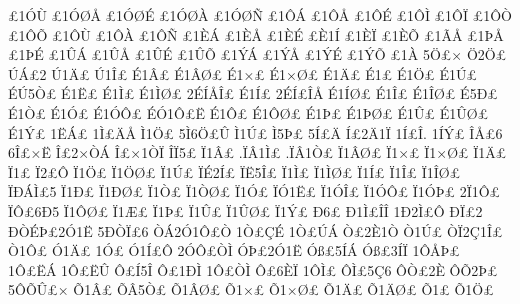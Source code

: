 {^^a31^^d3^^d9
^^a31^^d3^^d8^^c5
^^a31^^d3^^d8^^c9
^^a31^^d3^^d8^^c0
^^a31^^d3^^d8^^d1
^^a31^^d4^^c1
^^a31^^d4^^c5
^^a31^^d4^^c9
^^a31^^d4^^cc
^^a31^^d4^^cf
^^a31^^d4^^d2
^^a31^^d4^^d5
^^a31^^d4^^d9
^^a31^^d4^^c0
^^a31^^d4^^d1
^^a31^^c8^^c1
^^a31^^c8^^c5
^^a31^^c8^^c9
^^a3^^c81^^cd
^^a31^^c8^^cf
^^a31^^c8^^d5
^^a31^^c3^^c5
^^a31^^de^^c5
^^a31^^de^^c9
^^a31^^db^^c1
^^a31^^db^^c5
^^a31^^db^^c9
^^a31^^db^^d5
^^a31^^dd^^c1
^^a31^^dd^^c5
^^a31^^dd^^c9
^^a31^^dd^^d5
^^a31^^c0
5^^d6^^a3^^d7
^^d62^^d6^^a3
^^da^^c1^^a32
^^da1^^c4^^a3
^^da1^^ce^^a3
^^c91^^c2^^a3
^^c91^^c2^^d8^^a3
^^c91^^d7^^a3
^^c91^^d7^^d8^^a3
^^c91^^c4^^a3
^^c91^^a3
^^c91^^d6^^a3
^^c91^^da^^a3
^^c9^^da5^^d2^^a3
^^c91^^cb^^a3
^^c91^^cc^^a3
^^c91^^cc^^d8^^a3
2^^c9^^cd^^c5^^ce^^a3
^^c91^^cd^^a3
2^^c9^^cd^^a3^^ce^^c5
^^c91^^cd^^d8^^a3
^^c91^^ce^^a3
^^c91^^ce^^d8^^a3
^^c95^^d0^^a3
^^c91^^d2^^a3
^^c91^^d3^^a3
^^c91^^d3^^d4^^a3
^^c9^^d31^^d4^^a3^^cb
^^c91^^d4^^a3
^^c91^^d4^^d8^^a3
^^c91^^de^^a3
^^c91^^de^^d8^^a3
^^c91^^db^^a3
^^c91^^db^^d8^^a3
^^c91^^dd^^a3
1^^cb^^c1^^a3
1^^cc^^a3^^c4^^c5
^^cc1^^d6^^a3
5^^cc6^^d6^^a3^^db
^^cc1^^da^^a3
^^cc5^^de^^a3
5^^cd^^a3^^c4
^^cd^^a32^^c41^^cf
1^^cd^^a3^^ce.
1^^cd^^dd^^a3
^^ce^^c5^^a36
6^^ce^^a3^^d7^^cb
^^ce^^a32^^d7^^d2^^c1
^^ce^^a3^^d71^^d2^^cf
^^ce^^cf5^^a3
^^cf1^^c2^^a3
.^^cf^^c21^^cc^^a3
.^^cf^^c21^^d2^^a3
^^cf1^^c2^^d8^^a3
^^cf1^^d7^^a3
^^cf1^^d7^^d8^^a3
^^cf1^^c4^^a3
^^cf1^^a3
^^cf2^^a3^^d4
^^cf1^^d6^^a3
^^cf1^^d6^^d8^^a3
^^cf1^^da^^a3
^^cf^^c92^^cd^^a3
^^cf^^cb5^^ce^^a3
^^cf1^^cc^^a3
^^cf1^^cc^^d8^^a3
^^cf1^^cd^^a3
^^cf1^^ce^^a3
^^cf1^^ce^^d8^^a3
^^cf^^d0^^c1^^cc^^a35
^^cf1^^d0^^a3
^^cf1^^d0^^d8^^a3
^^cf1^^d2^^a3
^^cf1^^d2^^d8^^a3
^^cf1^^d3^^a3
^^cf^^d31^^cb^^a3
^^cf1^^d3^^ce^^a3
^^cf1^^d3^^d4^^a3
^^cf1^^d3^^de^^a3
2^^cf1^^d4^^a3
^^cf^^d4^^a36^^d05
^^cf1^^d4^^d8^^a3
^^cf1^^c6^^a3
^^cf1^^de^^a3
^^cf1^^db^^a3
^^cf1^^db^^d8^^a3
^^cf1^^dd^^a3
^^d06^^a3
^^d01^^cc^^a3^^ce^^ce
1^^d02^^cc^^a3^^d4
^^d0^^cf^^a32
^^d0^^d2^^c9^^de^^a32^^d31^^cb
5^^d0^^d2^^cf^^a36
^^d2^^c12^^d31^^d4^^a3^^d2
1^^d2^^a3^^c7^^c9
1^^d2^^a3^^da^^c1
^^d2^^a32^^c81^^d2
^^d21^^da^^a3
^^d2^^cf2^^c71^^ce^^a3
^^d21^^d4^^a3
^^d31^^c4^^a3
1^^d3^^a3
^^d31^^cd^^a3^^d4
2^^d3^^d4^^a3^^d2^^cc
^^d3^^de^^a32^^d31^^cb
^^d3^^df^^a35^^cd^^c1
^^d3^^df^^a33^^cd^^cf
1^^d4^^c5^^de^^a3
1^^d4^^a3^^cb^^c1
1^^d4^^a3^^cb^^db
^^d4^^a3^^cd5^^ce
^^d4^^a31^^d0^^cc
1^^d4^^a3^^d2^^cc
^^d4^^a36^^c8^^cf
1^^d4^^cc^^a3
^^d4^^cc^^a35^^c76
^^d4^^d2^^a32^^c8
^^d4^^d52^^de^^a3
5^^d4^^d5^^db^^a3^^d7
^^d51^^c2^^a3
^^d5^^c25^^d2^^a3
^^d51^^c2^^d8^^a3
^^d51^^d7^^a3
^^d51^^d7^^d8^^a3
^^d51^^c4^^a3
^^d51^^c4^^d8^^a3
^^d51^^a3
^^d51^^d6^^a3
}
